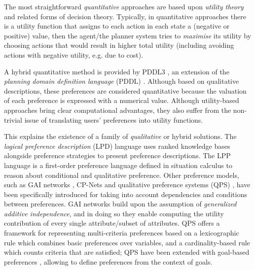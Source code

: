 The most straightforward \textit{quantitative} approaches are based upon \textit{utility theory} and related forms of decision theory.%
Typically, in quantitative approaches there is a utility function that assigns to each action in each state a (negative or positive) value, then the agent/the planner system tries to \textit{maximise} its utility by choosing actions that would result in higher total utility (including avoiding actions with negative utility, e.g. due to cost). 

A hybrid quantitative method is provided by PDDL3 \cite{Gerevini2005}, an extension of the \textit{planning domain definition language} (PDDL) \cite{McDermott1998}. Although based on qualitative descriptions, these preferences are considered quantitative \cite{Baier2007} because the valuation of each preference is expressed with a numerical value.
Although utility-based approaches bring clear computational advantages, they also suffer from the non-trivial issue of translating users' preferences into utility functions. 


This explains the existence of a family of \textit{qualitative} or hybrid solutions. %
The \textit{logical preference description} (LPD) language \cite{Brewka2004} uses ranked knowledge bases alongside preference strategies to present preference descriptions. The LPP language \cite{Bienvenu2006} is a first-order preference language defined in situation calculus to reason about conditional and qualitative preference.
Other preference models, such as GAI networks \cite{Gonzales2004}, CP-Nets \cite{Boutilier2004} and qualitative preference systems (QPS) \cite{Visser2012QPS}, have been specifically introduced for taking into account dependencies and conditions between preferences. GAI networks build upon the assumption of \textit{generalized additive independence}, and in doing so they enable computing the utility contribution of every single attribute/subset of attributes. QPS offers a framework for representing multi-criteria preferences based on a lexicographic rule which combines basic preferences over variables, and a cardinality-based rule which counts criteria that are satisfied; QPS have been extended with goal-based preferences \cite{Visser2013QPS}, allowing to define preferences from the context of goals.

